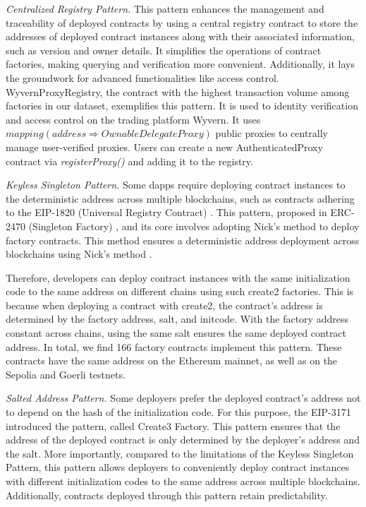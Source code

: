 \documentclass[acmsmall,screen]{acmart}
\begin{document}
	\textit{Centralized Registry Pattern.} This pattern enhances the management and traceability of deployed contracts by using a central registry contract to store the addresses of deployed contract instances along with their associated information, such as version and owner details. It simplifies the operations of contract factories, making querying and verification more convenient. Additionally, it lays the groundwork for advanced functionalities like access control.
	WyvernProxyRegistry, the contract with the highest transaction volume among factories in our dataset, exemplifies this pattern. It is used to identity verification and access control on the trading platform Wyvern. It uses $mapping(address \Rightarrow OwnableDelegateProxy)$ public proxies to centrally manage user-verified proxies. Users can create a new AuthenticatedProxy contract via \textit{registerProxy()} and adding it to the registry.


	\textit{Keyless Singleton Pattern.} Some dapps require deploying contract instances to the deterministic address across multiple blockchains, such as contracts adhering to the EIP-1820 (Universal Registry Contract) \cite{eip-1820}. This pattern, proposed in ERC-2470 (Singleton Factory) \cite{eip-2470}, and its core involves adopting Nick's method \cite{nickmethod} to deploy factory contracts. This method ensures a deterministic address deployment across blockchains using Nick's method \cite{nickmethod}.

	Therefore, developers can deploy contract instances with the same initialization code to the same address on different chains using such create2 factories. This is because when deploying a contract with create2, the contract's address is determined by the factory address, salt, and initcode. With the factory address constant across chains, using the same salt ensures the same deployed contract address. In total, we find 166 factory contracts implement this pattern. These contracts have the same address on the Ethereum mainnet, as well as on the Sepolia \cite{sepolia} and Goerli \cite{goerli} testnets.

	\textit{Salted Address Pattern.} Some deployers prefer the deployed contract's address not to depend on the hash of the initialization code. For this purpose, the EIP-3171 \cite{eip-3171} introduced the pattern, called Create3 Factory. This pattern ensures that the address of the deployed contract is only determined by the deployer's address and the salt. More importantly, compared to the limitations of the Keyless Singleton Pattern, this pattern allows deployers to conveniently deploy contract instances with different initialization codes to the same address across multiple blockchains. Additionally, contracts deployed through this pattern retain predictability.
\end{document}
